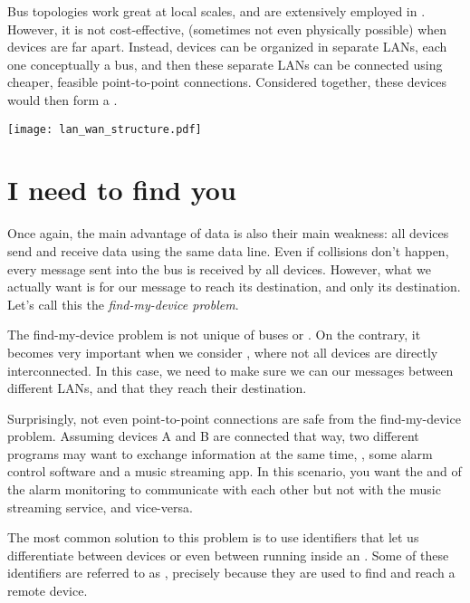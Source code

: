 Bus topologies work great at local scales, and are extensively employed in
. However, it is not cost-effective,
(sometimes not even physically possible) when devices are far apart.
% 
Instead, devices can be organized in separate LANs, each one conceptually a bus, 
and then these separate LANs can be connected using cheaper, feasible point-to-point
connections. Considered together, these devices would then form a 
.

\begin{center}
\texttt{[image: lan\_wan\_structure.pdf]}
\end{center}


\section{I need to find you}\label{sec:where:addresses}

Once again, the main advantage of data  is also their main weakness: 
all devices send and receive data using the same data line. 
Even if collisions don't happen, every message sent into the bus is 
received by all devices.
However, what we actually want is for our message to reach its destination, 
and only its destination. Let's call this the \textit{find-my-device problem}.

The find-my-device problem is not unique of buses or . On the contrary, it becomes 
very important when we consider , where not all devices are directly interconnected.
In this case, we need to make sure we can  our messages
between different LANs, and that they reach their destination.

Surprisingly, not even point-to-point connections are safe from the find-my-device problem.
Assuming devices A and B are connected that way, two different programs may want to 
exchange information at the same time, \eg, some alarm control software and 
a music streaming app. 
In this scenario, you want the  and  of the alarm monitoring 
 to communicate with each other but not with the music streaming service, 
and vice-versa.

The most common solution to this problem is to use identifiers that let
us differentiate between devices or even between running 
inside an . Some of these identifiers are
referred to as , precisely because they are used 
to find and reach a remote device. 


